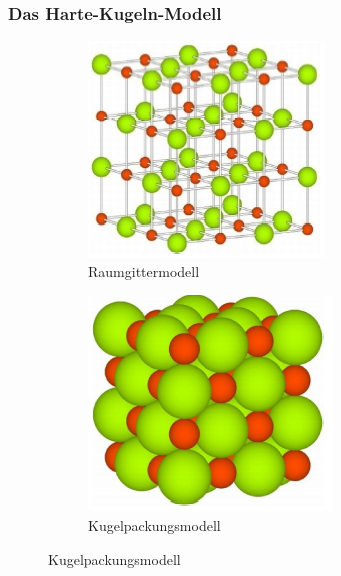 \subsubsection{Das Harte-Kugeln-Modell}
\begin{figure}[htbp]
	\begin{subfigure}{0.49\linewidth}
		\centering
		\includegraphics[width=0.49\linewidth]{images/1_Raumgittermodell.png}
		\caption{Raumgittermodell}
	\end{subfigure}
	\begin{subfigure}{0.49\linewidth}
		\centering
		\includegraphics[width=0.49\linewidth]{images/1_Kugelpackungsmodell.png}
		\caption{Kugelpackungsmodell}
	\end{subfigure}
\end{figure}

